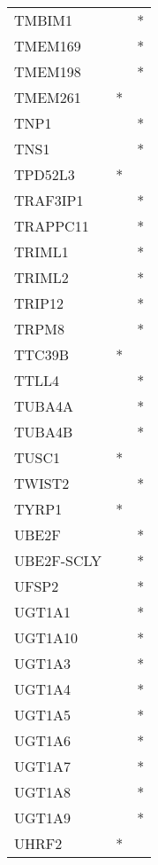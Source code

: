 \begin{longtable}{lcc}
TMBIM1         &           &       * \\
TMEM169        &           &       * \\
TMEM198        &           &       * \\
TMEM261        &         * &         \\
TNP1           &           &       * \\
TNS1           &           &       * \\
TPD52L3        &         * &         \\
TRAF3IP1       &           &       * \\
TRAPPC11       &           &       * \\
TRIML1         &           &       * \\
TRIML2         &           &       * \\
TRIP12         &           &       * \\
TRPM8          &           &       * \\
TTC39B         &         * &         \\
TTLL4          &           &       * \\
TUBA4A         &           &       * \\
TUBA4B         &           &       * \\
TUSC1          &         * &         \\
TWIST2         &           &       * \\
TYRP1          &         * &         \\
UBE2F          &           &       * \\
UBE2F-SCLY     &           &       * \\
UFSP2          &           &       * \\
UGT1A1         &           &       * \\
UGT1A10        &           &       * \\
UGT1A3         &           &       * \\
UGT1A4         &           &       * \\
UGT1A5         &           &       * \\
UGT1A6         &           &       * \\
UGT1A7         &           &       * \\
UGT1A8         &           &       * \\
UGT1A9         &           &       * \\
UHRF2          &         * &         \\

\end{longtable}
